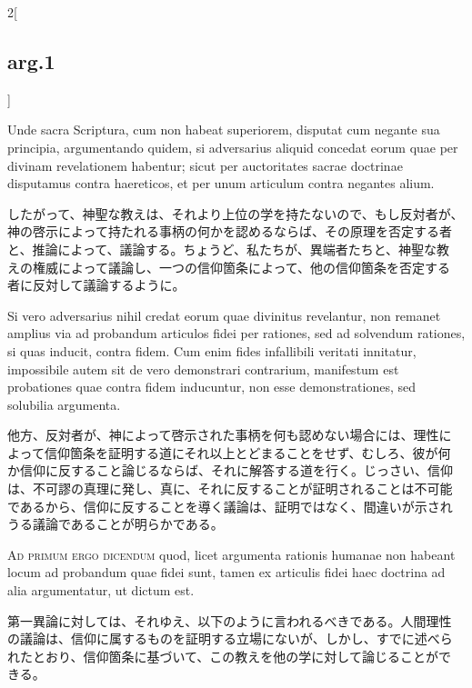 \documentclass[
paper=a4paper,
fontsize=10pt,
jafontsize=9pt,
titlepage
]{jlreq}
\begin{document}
\begin{paracol}{2}[\subsection{arg.1}]
\switchcolumn*

Unde sacra Scriptura, cum non habeat superiorem, disputat cum negante
sua principia, argumentando quidem, si adversarius aliquid concedat
eorum quae per divinam revelationem habentur; sicut per auctoritates
sacrae doctrinae disputamus contra haereticos, et per unum articulum
contra negantes alium.

\switchcolumn

したがって、神聖な教えは、それより上位の学を持たないので、もし反対者が、
神の啓示によって持たれる事柄の何かを認めるならば、その原理を否定する者
と、推論によって、議論する。ちょうど、私たちが、異端者たちと、神聖な教
えの権威によって議論し、一つの信仰箇条によって、他の信仰箇条を否定する
者に反対して議論するように。

\switchcolumn*

Si vero adversarius nihil credat eorum quae divinitus revelantur, non
remanet amplius via ad probandum articulos fidei per rationes, sed ad
solvendum rationes, si quas inducit, contra fidem. Cum enim fides
infallibili veritati innitatur, impossibile autem sit de vero
demonstrari contrarium, manifestum est probationes quae contra fidem
inducuntur, non esse demonstrationes, sed solubilia argumenta.

\switchcolumn

他方、反対者が、神によって啓示された事柄を何も認めない場合には、理性に
よって信仰箇条を証明する道にそれ以上とどまることをせず、むしろ、彼が何
か信仰に反すること論じるならば、それに解答する道を行く。じっさい、信仰
は、不可謬の真理に発し、真に、それに反することが証明されることは不可能
であるから、信仰に反することを導く議論は、証明ではなく、間違いが示され
うる議論であることが明らかである。

\switchcolumn*[\subsection{ad.1}]

{\scshape Ad primum ergo dicendum} quod, licet argumenta rationis
humanae non habeant locum ad probandum quae fidei sunt, tamen ex
articulis fidei haec doctrina ad alia argumentatur, ut dictum est.

\switchcolumn

第一異論に対しては、それゆえ、以下のように言われるべきである。人間理性
の議論は、信仰に属するものを証明する立場にないが、しかし、すでに述べら
れたとおり、信仰箇条に基づいて、この教えを他の学に対して論じることがで
きる。

\switchcolumn*[\subsection{ad.2}]


\end{paracol}
\end{document}
